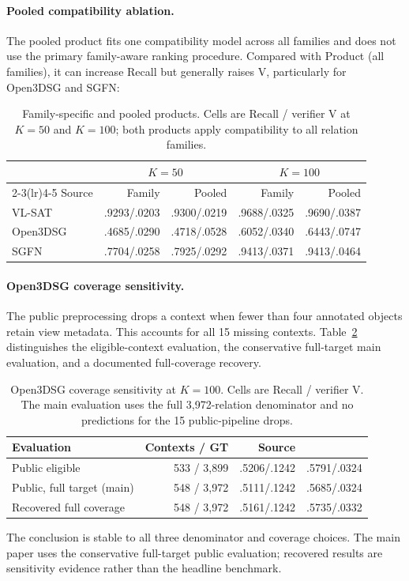 \paragraph{Pooled compatibility ablation.}
The pooled product fits one compatibility model across all families and does
not use the primary family-aware ranking procedure. Compared with Product (all
families), it can increase Recall but generally raises V,
particularly for Open3DSG and SGFN:

\begin{table}[t]
\centering
{\small
\setlength{\tabcolsep}{2.4pt}
\begin{tabular}{lrrrr}
\toprule
& \multicolumn{2}{c}{$K=50$} & \multicolumn{2}{c}{$K=100$} \\
\cmidrule(lr){2-3}\cmidrule(lr){4-5}
Source & Family & Pooled & Family & Pooled \\
\midrule
VL-SAT & .9293/.0203 & .9300/.0219 & .9688/.0325 & .9690/.0387 \\
Open3DSG & .4685/.0290 & .4718/.0528 & .6052/.0340 & .6443/.0747 \\
SGFN & .7704/.0258 & .7925/.0292 & .9413/.0371 & .9413/.0464 \\
\bottomrule
\end{tabular}
}
\caption{Family-specific and pooled products. Cells are Recall / verifier V
at $K=50$ and $K=100$; both products apply compatibility to all relation
families.}
\label{tab:pooled-ablation}
\end{table}

\paragraph{Open3DSG coverage sensitivity.}
The public preprocessing drops a context when fewer than four annotated
objects retain view metadata. This accounts for all 15 missing contexts.
Table~\ref{tab:open3dsg-routes} distinguishes the eligible-context
evaluation, the conservative full-target main evaluation, and a documented
full-coverage recovery.

\begin{table}[t]
\centering
{\small
\setlength{\tabcolsep}{2pt}
\begin{tabularx}{\linewidth}{@{}>{\raggedright\arraybackslash}Xrrr@{}}
\toprule
Evaluation & Contexts / GT & Source & \method{} \\
\midrule
Public eligible & 533 / 3,899 & .5206/.1242 & .5791/.0324 \\
Public, full target (main) & 548 / 3,972 & .5111/.1242 & .5685/.0324 \\
Recovered full coverage & 548 / 3,972 & .5161/.1242 & .5735/.0332 \\
\bottomrule
\end{tabularx}
}
\caption{Open3DSG coverage sensitivity at $K=100$. Cells are Recall / verifier
V. The main evaluation uses the full 3,972-relation denominator and no
predictions for the 15 public-pipeline drops.}
\label{tab:open3dsg-routes}
\end{table}

The conclusion is stable to all three denominator and coverage choices. The
main paper uses the conservative full-target public evaluation; recovered results
are sensitivity evidence rather than the headline benchmark.
